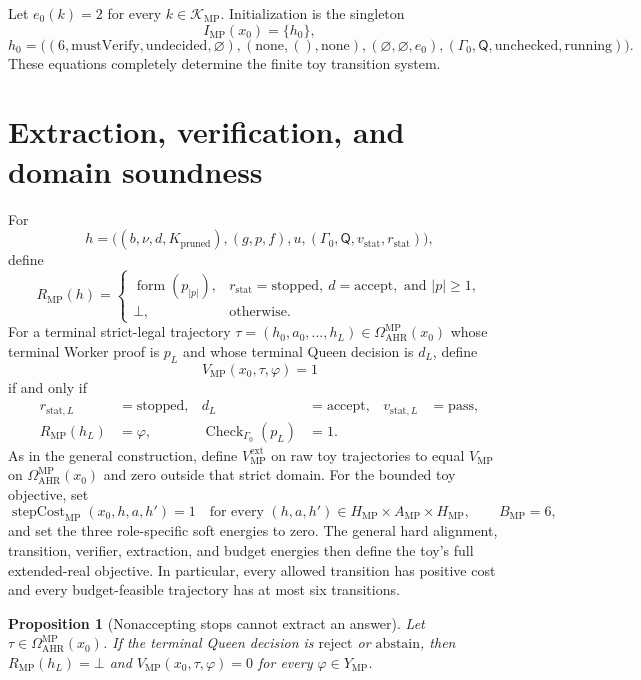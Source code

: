 \documentclass[11pt,oneside]{book}
\newtheorem{proposition}[definition]{Proposition}
\theoremstyle{remark}
\newcommand{\Om}{\Omega}
\DeclareMathOperator{\ProofCheck}{Check}
\begin{document}
Let $e_0(k)=2$ for every $k\in\mathcal K_{\mathrm{MP}}$. Initialization is
the singleton
\[
I_{\mathrm{MP}}(x_0)=\{h_0\},
\]
\[
h_0=\bigl(
(6,\mathrm{mustVerify},\mathrm{undecided},\varnothing),
(\mathrm{none},(),\mathrm{none}),
(\varnothing,\varnothing,e_0),
(\Gamma_0,\mathsf Q,\mathrm{unchecked},\mathrm{running})
\bigr).
\]
These equations completely determine the finite toy transition system.

\section{Extraction, verification, and domain soundness}

For
\[
h=\bigl((b,\nu,d,K_{\mathrm{pruned}}),(g,p,f),u,
(\Gamma_0,\mathsf Q,v_{\mathrm{stat}},r_{\mathrm{stat}})\bigr),
\]
define
\[
R_{\mathrm{MP}}(h)=
\begin{cases}
\operatorname{form}(p_{|p|}),&
r_{\mathrm{stat}}=\mathrm{stopped},\
d=\mathrm{accept},\text{ and }|p|\ge1,\\
\bot,&\text{otherwise}.
\end{cases}
\]
For a terminal strict-legal trajectory
$\tau=(h_0,a_0,\ldots,h_L)\in\Om_{\mathrm{AHR}}^{\mathrm{MP}}(x_0)$ whose
terminal Worker proof is $p_L$ and whose terminal Queen decision is $d_L$,
define
\[
V_{\mathrm{MP}}(x_0,\tau,\varphi)=1
\]
if and only if
\[
\begin{aligned}
r_{\mathrm{stat},L}&=\mathrm{stopped},&
d_L&=\mathrm{accept},&
v_{\mathrm{stat},L}&=\mathrm{pass},\\
R_{\mathrm{MP}}(h_L)&=\varphi,&
\ProofCheck_{\Gamma_0}(p_L)&=1.&&
\end{aligned}
\]
As in the general construction, define
$V_{\mathrm{MP}}^{\mathrm{ext}}$ on raw toy trajectories to equal
$V_{\mathrm{MP}}$ on
$\Om_{\mathrm{AHR}}^{\mathrm{MP}}(x_0)$ and zero outside that strict domain.
For the bounded toy objective, set
\[
\operatorname{stepCost}_{\mathrm{MP}}(x_0,h,a,h')=1
\quad\text{for every }(h,a,h')\in H_{\mathrm{MP}}\times
A_{\mathrm{MP}}\times H_{\mathrm{MP}},
\qquad
B_{\mathrm{MP}}=6,
\]
and set the three role-specific soft energies to zero. The general hard
alignment, transition, verifier, extraction, and budget energies then define
the toy's full extended-real objective. In particular, every allowed
transition has positive cost and every budget-feasible trajectory has at most
six transitions.

\begin{proposition}[Nonaccepting stops cannot extract an answer]
Let $\tau\in\Om_{\mathrm{AHR}}^{\mathrm{MP}}(x_0)$. If the terminal Queen
decision is $\mathrm{reject}$ or $\mathrm{abstain}$,
then $R_{\mathrm{MP}}(h_L)=\bot$ and
$V_{\mathrm{MP}}(x_0,\tau,\varphi)=0$ for every
$\varphi\in Y_{\mathrm{MP}}$.
\end{proposition}
\end{document}
